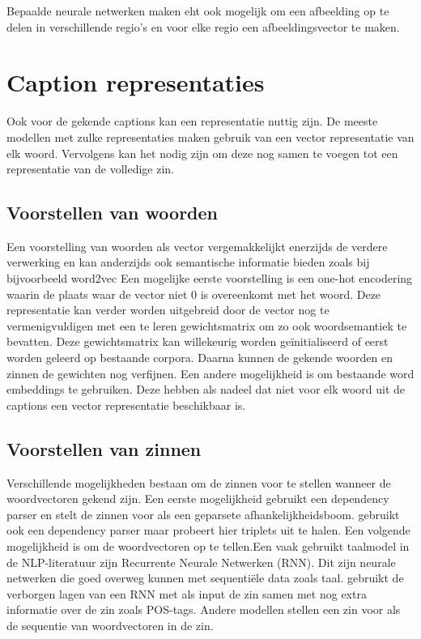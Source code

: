 Bepaalde neurale netwerken maken eht ook mogelijk om een afbeelding op te delen in verschillende regio's en voor elke regio een afbeeldingsvector te maken.\cite{karpathy}\cite{Fang}

\section{Caption representaties}
Ook voor de gekende captions kan een representatie nuttig zijn. De meeste modellen met zulke representaties maken gebruik van een vector representatie van elk woord. Vervolgens kan het nodig zijn om deze nog samen te voegen tot een representatie van de volledige zin.

\subsection{Voorstellen van woorden}
 Een voorstelling van woorden als vector vergemakkelijkt enerzijds de verdere verwerking en kan anderzijds ook semantische informatie bieden zoals bij bijvoorbeeld word2vec\cite{mikolov}
 Een mogelijke eerste voorstelling is een one-hot encodering waarin de plaats waar de vector niet 0 is overeenkomt met het woord. Deze representatie kan verder worden uitgebreid door de vector nog te vermenigvuldigen met een te leren gewichtsmatrix om zo ook woordsemantiek te bevatten.  Deze gewichtsmatrix kan willekeurig worden ge\"initialiseerd of eerst worden geleerd op bestaande corpora.\cite{Lebret}\cite{Vinyals}\cite{Mao} Daarna kunnen de gekende woorden en zinnen de gewichten nog verfijnen.  Een andere mogelijkheid is om bestaande word embeddings te gebruiken.\cite{mikolov} Deze hebben als nadeel dat niet voor elk woord uit de captions een vector representatie beschikbaar is. 
 
 \subsection{Voorstellen van zinnen}
 Verschillende mogelijkheden bestaan om de zinnen voor te stellen wanneer de woordvectoren gekend zijn. Een eerste mogelijkheid gebruikt een dependency parser en stelt de zinnen voor als een geparsete afhankelijkheidsboom.\cite{Socher}\cite{Karpathy} gebruikt ook een dependency parser maar probeert hier triplets uit te halen. Een volgende mogelijkheid is om de woordvectoren op te tellen.\cite{lebret}Een vaak gebruikt taalmodel in de NLP-literatuur zijn Recurrente Neurale Netwerken (RNN).\cite{mikolov maar de RNN} Dit zijn neurale netwerken die goed overweg kunnen met sequenti\"ele data zoals taal.\cite{Kiros} gebruikt de verborgen lagen van een RNN met als input de zin samen met nog extra informatie over de zin zoals POS-tags. Andere modellen stellen een zin voor als de sequentie van woordvectoren in de zin.
 
